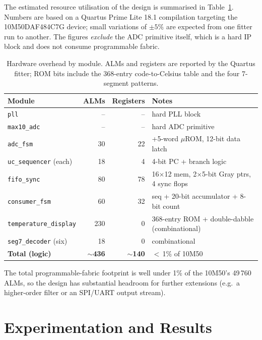 \documentclass[12pt,letterpaper]{article}
\begin{document}
The estimated resource utilisation of the design is summarised in
Table~\ref{tab:overhead}.  Numbers are based on a Quartus Prime Lite 18.1
compilation targeting the \mbox{10M50DAF484C7G} device; small variations of
$\pm 5\%$ are expected from one fitter run to another.  The figures
\emph{exclude} the ADC primitive itself, which is a hard IP block and does
not consume programmable fabric.

\begin{table}[h]
\centering
\caption{Hardware overhead by module.  ALMs and registers are reported by
  the Quartus fitter; ROM bits include the 368-entry code-to-Celsius table
  and the four 7-segment patterns.}
\label{tab:overhead}
\begin{tabular}{lrrl}
\toprule
Module & ALMs & Registers & Notes \\
\midrule
\texttt{pll}                  & --    & --    & hard PLL block \\
\texttt{max10\_adc}           & --    & --    & hard ADC primitive \\
\texttt{adc\_fsm}             & 30    & 22    & +5-word $\mu$ROM, 12-bit data latch \\
\texttt{uc\_sequencer} (each) & 18    & 4     & 4-bit PC + branch logic \\
\texttt{fifo\_sync}           & 80    & 78    & 16$\times$12 mem, 2$\times$5-bit Gray ptrs, 4 sync flops \\
\texttt{consumer\_fsm}        & 60    & 32    & seq + 20-bit accumulator + 8-bit count \\
\texttt{temperature\_display} & 230   & 0     & 368-entry ROM + double-dabble (combinational) \\
\texttt{seg7\_decoder} (six)  & 18    & 0     & combinational \\
\midrule
\textbf{Total (logic)}        & \textbf{$\sim$436} & \textbf{$\sim$140} & \(<\)\,1\% of 10M50 \\
\bottomrule
\end{tabular}
\end{table}

The total programmable-fabric footprint is well under 1\% of the 10M50's
49\,760 ALMs, so the design has substantial headroom for further extensions
(e.g.~a higher-order filter or an SPI/UART output stream).

\section{Experimentation and Results}
\label{sec:results}
\end{document}
